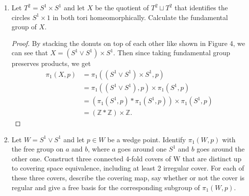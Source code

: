 \documentclass{article}
\begin{document}
\begin{enumerate}[label={\bf Q\arabic*:}]
  \item Let $T^2=S^1\times S^1$ and let $X$ be the quotient of $T^2\sqcup
    T^2$ that identifies the circles $S^1\times1$ in both tori
    homeomorphically. Calculate the fundamental group of $X$.
    \begin{proof}
      By stacking the donuts on top of each other like shown in Figure 4,
      we can see that $X=(S^1\vee S^1)\times S^1$. Then since taking
      fundamental group preserves products, we get
      \begin{align*}
        \pi_1(X,p) &= \pi_1((S^1\vee S^1)\times S^1,p) \\
                   &= \pi_1((S^1\vee S^1),p)\times \pi_1(S^1,p) \\
                   &= (\pi_1(S^1,p)\ast\pi_1(S^1,p))\times \pi_1(S^1,p) \\
                   &= (\mathbb{Z}\ast\mathbb{Z})\times\mathbb{Z}.
      \end{align*}
    \end{proof}

  \item Let $W=S^1\vee S^1$ and let $p\in W$ be a wedge point. Identify
    $\pi_1(W,p)$ with the free group on $a$ and $b$, where $a$ goes around
    one $S^1$ and $b$ goes around the other one. Construct three connected
    4-fold covers of W that are distinct up to covering space equivalence,
    including at least 2 irregular cover. For each of these three covers,
    describe the covering map, say whether or not the cover is regular and
    give a free basis for the corresponding subgroup of $\pi_1(W,p)$.
\end{enumerate}
\end{document}
